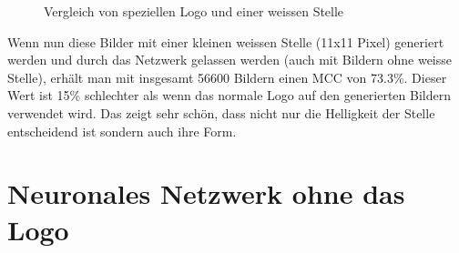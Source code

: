 \documentclass[12pt,a4paper]{report}
\begin{document}
\begin{figure}[h]%
    \centering
    \qquad
    \caption{Vergleich von speziellen Logo und einer weissen Stelle}
    \label{fig:white_square}%
\end{figure}

Wenn nun diese Bilder mit einer kleinen weissen Stelle (11x11 Pixel) generiert werden und durch das Netzwerk gelassen werden (auch mit Bildern ohne weisse Stelle),
erhält man mit insgesamt 56600 Bildern einen MCC von 73.3\%.
Dieser Wert ist 15\% schlechter als wenn das normale Logo auf den generierten Bildern verwendet wird.
Das zeigt sehr schön, dass nicht nur die Helligkeit der Stelle entscheidend ist sondern auch ihre Form.

\section{Neuronales Netzwerk ohne das Logo}
\end{document}
